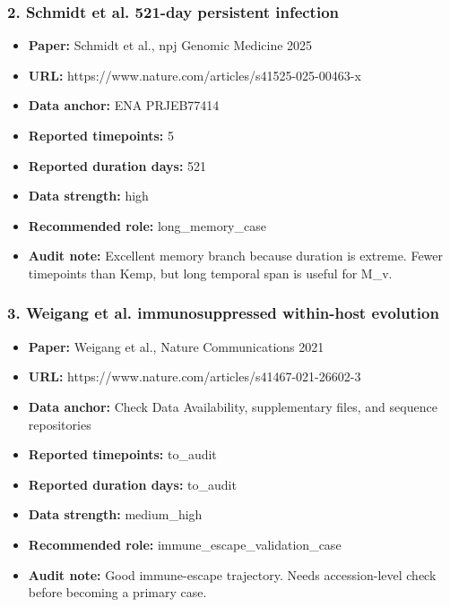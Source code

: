\subsubsection*{2. Schmidt et al. 521-day persistent infection}
\begin{itemize}
\item \textbf{Paper:} Schmidt et al., npj Genomic Medicine 2025
\item \textbf{URL:} https://www.nature.com/articles/s41525-025-00463-x
\item \textbf{Data anchor:} ENA PRJEB77414
\item \textbf{Reported timepoints:} 5
\item \textbf{Reported duration days:} 521
\item \textbf{Data strength:} high
\item \textbf{Recommended role:} long\_memory\_case
\item \textbf{Audit note:} Excellent memory branch because duration is extreme. Fewer timepoints than Kemp, but long temporal span is useful for M\_v.
\end{itemize}

\subsubsection*{3. Weigang et al. immunosuppressed within-host evolution}
\begin{itemize}
\item \textbf{Paper:} Weigang et al., Nature Communications 2021
\item \textbf{URL:} https://www.nature.com/articles/s41467-021-26602-3
\item \textbf{Data anchor:} Check Data Availability, supplementary files, and sequence repositories
\item \textbf{Reported timepoints:} to\_audit
\item \textbf{Reported duration days:} to\_audit
\item \textbf{Data strength:} medium\_high
\item \textbf{Recommended role:} immune\_escape\_validation\_case
\item \textbf{Audit note:} Good immune-escape trajectory. Needs accession-level check before becoming a primary case.
\end{itemize}

